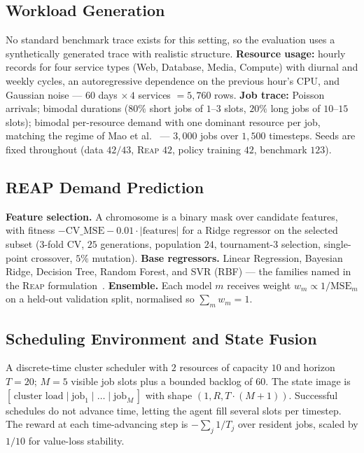 \documentclass{svproc}
\newcommand{\reap}{\textsc{Reap}}
\begin{document}
\subsection{Workload Generation}\label{sec:data}
No standard benchmark trace exists for this setting, so the evaluation
uses a synthetically generated trace with realistic structure.
\textbf{Resource usage:} hourly records for four service types (Web,
Database, Media, Compute) with diurnal and weekly cycles, an
autoregressive dependence on the previous hour's CPU, and Gaussian
noise --- $60$ days $\times\,4$ services $=5{,}760$ rows.
\textbf{Job trace:} Poisson arrivals; bimodal durations ($80\%$ short
jobs of $1$--$3$ slots, $20\%$ long jobs of $10$--$15$ slots); bimodal
per-resource demand with one dominant resource per job, matching the
regime of Mao et al.~\cite{mao2016} --- $3{,}000$ jobs over $1{,}500$
timesteps. Seeds are fixed throughout (data $42/43$, \reap{} $42$,
policy training $42$, benchmark $123$).

\subsection{REAP Demand Prediction}\label{sec:reap}
\textbf{Feature selection.} A chromosome is a binary mask over
candidate features, with fitness
$-\mathrm{CV\_MSE}-0.01\cdot|\text{features}|$ for a Ridge regressor on
the selected subset ($3$-fold CV, $25$ generations, population $24$,
tournament-$3$ selection, single-point crossover, $5\%$ mutation).
\textbf{Base regressors.} Linear Regression, Bayesian Ridge, Decision
Tree, Random Forest, and SVR (RBF) --- the families named in the \reap{}
formulation~\cite{kaur2019}. \textbf{Ensemble.} Each model $m$ receives
weight $w_m\propto 1/\mathrm{MSE}_m$ on a held-out validation split,
normalised so $\sum_m w_m = 1$.

\subsection{Scheduling Environment and State Fusion}\label{sec:env}
A discrete-time cluster scheduler with $2$ resources of capacity $10$
and horizon $T{=}20$; $M{=}5$ visible job slots plus a bounded backlog
of $60$. The state image is
$[\,\text{cluster load}\mid\text{job}_1\mid\dots\mid\text{job}_M\,]$
with shape $(1,R,T\cdot(M{+}1))$. Successful schedules do not advance
time, letting the agent fill several slots per timestep. The reward at
each time-advancing step is $-\sum_j 1/T_j$ over resident jobs, scaled
by $1/10$ for value-loss stability.
\end{document}
